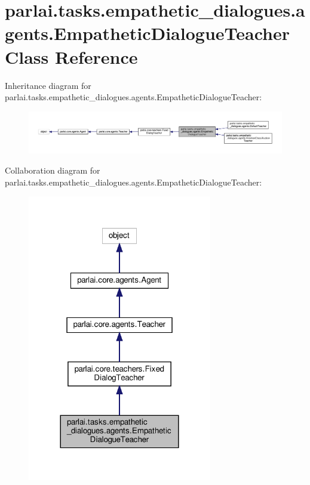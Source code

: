 \hypertarget{classparlai_1_1tasks_1_1empathetic__dialogues_1_1agents_1_1EmpatheticDialogueTeacher}{}\section{parlai.\+tasks.\+empathetic\+\_\+dialogues.\+agents.\+Empathetic\+Dialogue\+Teacher Class Reference}
\label{classparlai_1_1tasks_1_1empathetic__dialogues_1_1agents_1_1EmpatheticDialogueTeacher}


Inheritance diagram for parlai.\+tasks.\+empathetic\+\_\+dialogues.\+agents.\+Empathetic\+Dialogue\+Teacher\+:
\nopagebreak
\begin{figure}[H]
\begin{center}
\leavevmode
\includegraphics[width=350pt]{d5/d28/classparlai_1_1tasks_1_1empathetic__dialogues_1_1agents_1_1EmpatheticDialogueTeacher__inherit__graph}
\end{center}
\end{figure}


Collaboration diagram for parlai.\+tasks.\+empathetic\+\_\+dialogues.\+agents.\+Empathetic\+Dialogue\+Teacher\+:
\nopagebreak
\begin{figure}[H]
\begin{center}
\leavevmode
\includegraphics[width=228pt]{dd/d3b/classparlai_1_1tasks_1_1empathetic__dialogues_1_1agents_1_1EmpatheticDialogueTeacher__coll__graph}
\end{center}
\end{figure}
